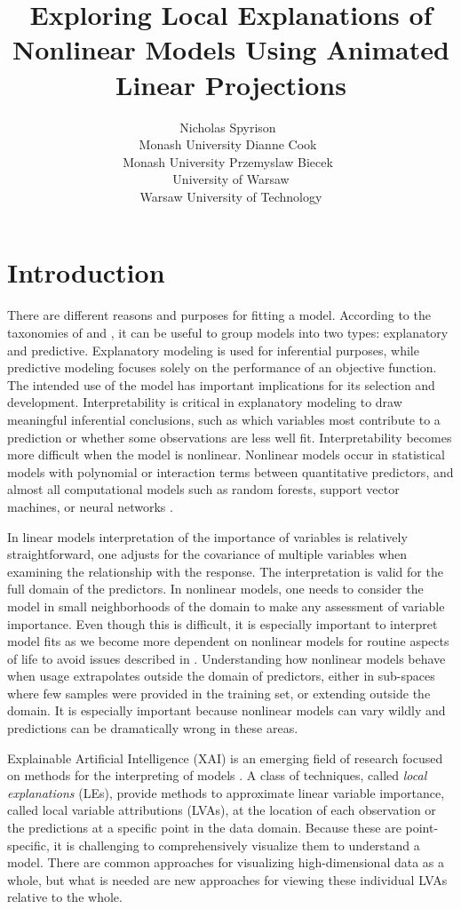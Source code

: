 \documentclass[
]{jss}
\author{
Nicholas Spyrison~\orcidlink{0000-0002-8417-0212}\\Monash
University \And Dianne Cook~\orcidlink{0000-0002-3813-7155}\\Monash
University \And Przemyslaw
Biecek~\orcidlink{0000-0001-8423-1823}\\University of Warsaw\\
Warsaw University of Technology
}
\title{Exploring Local Explanations of Nonlinear Models Using Animated
Linear Projections}
\begin{document}
\hypertarget{sec:intro}{%
\section{Introduction}\label{sec:intro}}

There are different reasons and purposes for fitting a model. According
to the taxonomies of \citet{breiman_statistical_2001} and
\citet{shmueli_explain_2010}, it can be useful to group models into two
types: explanatory and predictive. Explanatory modeling is used for
inferential purposes, while predictive modeling focuses solely on the
performance of an objective function. The intended use of the model has
important implications for its selection and development.
Interpretability is critical in explanatory modeling to draw meaningful
inferential conclusions, such as which variables most contribute to a
prediction or whether some observations are less well fit.
Interpretability becomes more difficult when the model is nonlinear.
Nonlinear models occur in statistical models with polynomial or
interaction terms between quantitative predictors, and almost all
computational models such as random forests, support vector machines, or
neural networks
\citep[e.g.][]{breiman_random_2001, boser_training_1992, anderson_introduction_1995}.

In linear models interpretation of the importance of variables is
relatively straightforward, one adjusts for the covariance of multiple
variables when examining the relationship with the response. The
interpretation is valid for the full domain of the predictors. In
nonlinear models, one needs to consider the model in small neighborhoods
of the domain to make any assessment of variable importance. Even though
this is difficult, it is especially important to interpret model fits as
we become more dependent on nonlinear models for routine aspects of life
to avoid issues described in \citet{stahl-ethics}. Understanding how
nonlinear models behave when usage extrapolates outside the domain of
predictors, either in sub-spaces where few samples were provided in the
training set, or extending outside the domain. It is especially
important because nonlinear models can vary wildly and predictions can
be dramatically wrong in these areas.

Explainable Artificial Intelligence (XAI) is an emerging field of
research focused on methods for the interpreting of models
\citep{adadi_peeking_2018, arrieta_explainable_2020}. A class of
techniques, called \emph{local explanations} (LEs), provide methods to
approximate linear variable importance, called local variable
attributions (LVAs), at the location of each observation or the
predictions at a specific point in the data domain. Because these are
point-specific, it is challenging to comprehensively visualize them to
understand a model. There are common approaches for visualizing
high-dimensional data as a whole, but what is needed are new approaches
for viewing these individual LVAs relative to the whole.
\end{document}
